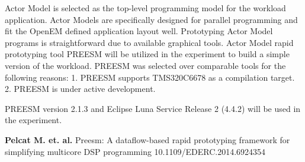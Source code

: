 Actor Model is selected as the top-level programming model for the workload application. Actor Models are specifically designed for parallel programming and fit the OpenEM defined application layout well. Prototyping Actor Model programs is straightforward due to available graphical tools. Actor Model rapid prototyping tool PREESM will be utilized in the experiment to build a simple version of the workload. PREESM was selected over comparable tools for the following reasons: 1. PREESM supports TMS320C6678 as a compilation target. 2. PREESM is under active development.

PREESM version 2.1.3 and Eclipse Luna Service Release 2 (4.4.2) will be used in the experiment.

\textbf{Pelcat M. et. al.} Preesm: A dataflow-based rapid prototyping framework for simplifying multicore DSP programming 10.1109/EDERC.2014.6924354
